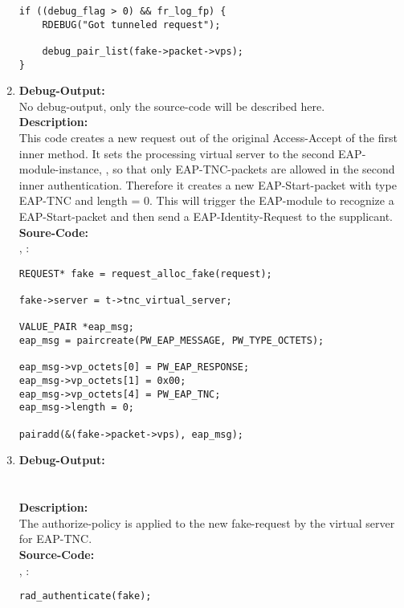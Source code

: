 \begin{enumerate}
\begin{lstlisting}
if ((debug_flag > 0) && fr_log_fp) {
	RDEBUG("Got tunneled request");

	debug_pair_list(fake->packet->vps);
}
\end{lstlisting}

\newpage

\item \textbf{Debug-Output:}\\
No debug-output, only the source-code will be described here.\\
\newline
\textbf{Description:}\\
This code creates a new request out of the original Access-Accept of the first inner method.
It sets the processing virtual server to the second EAP-module-instance, , so that only EAP-TNC-packets are allowed in the second inner authentication.
Therefore it creates a new EAP-Start-packet with type EAP-TNC and length = 0.
This will trigger the EAP-module to recognize a EAP-Start-packet and then send a EAP-Identity-Request to the supplicant.\\
\newline
\textbf{Soure-Code:}\\
, :
\begin{lstlisting}
REQUEST* fake = request_alloc_fake(request);

fake->server = t->tnc_virtual_server;

VALUE_PAIR *eap_msg;
eap_msg = paircreate(PW_EAP_MESSAGE, PW_TYPE_OCTETS);

eap_msg->vp_octets[0] = PW_EAP_RESPONSE;
eap_msg->vp_octets[1] = 0x00;
eap_msg->vp_octets[4] = PW_EAP_TNC;
eap_msg->length = 0;

pairadd(&(fake->packet->vps), eap_msg);
\end{lstlisting}

\item \textbf{Debug-Output:}\\
\\
\\
\newline
\textbf{Description:}\\
The authorize-policy is applied to the new fake-request by the virtual server for EAP-TNC.\\
\newline
\textbf{Source-Code:}\\
, :
\begin{lstlisting}
rad_authenticate(fake);
\end{lstlisting}


\end{enumerate}
